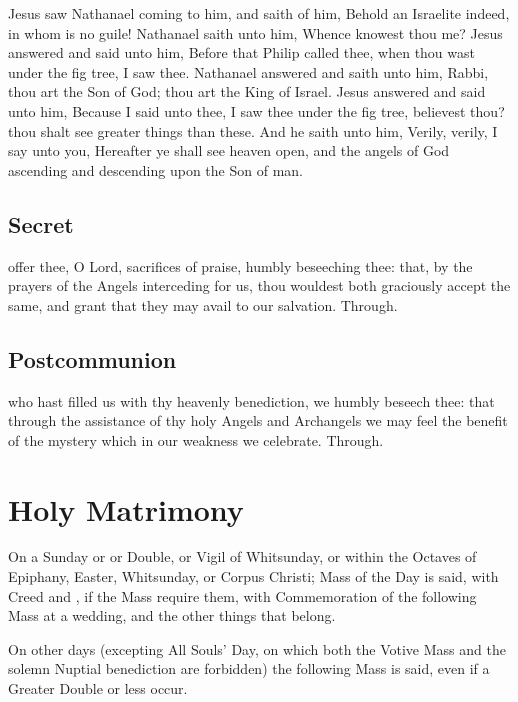  Jesus saw Nathanael coming to him, and saith of him, Behold an Israelite indeed, in whom is no guile! Nathanael saith unto him, Whence knowest thou me? Jesus answered and said unto him, Before that Philip called thee, when thou wast under the fig tree, I saw thee. Nathanael answered and saith unto him, Rabbi, thou art the Son of God; thou art the King of Israel. Jesus answered and said unto him, Because I said unto thee, I saw thee under the fig tree, believest thou? thou shalt see greater things than these. And he saith unto him, Verily, verily, I say unto you, Hereafter ye shall see heaven open, and the angels of God ascending and descending upon the Son of man.


\subsection{Secret}
 offer thee, O Lord, sacrifices of praise, humbly beseeching thee: that, by the prayers of the Angels interceding for us, thou wouldest both graciously accept the same, and grant that they may avail to our salvation. Through.


\subsection{Postcommunion}
 who hast filled us with thy heavenly benediction, we humbly beseech thee: that through the assistance of thy holy Angels and Archangels we may feel the benefit of the mystery which in our weakness we celebrate. Through.

\clearpage

\section{Holy Matrimony}\label{MatrimonyMass}
\fancyhead[RE,LO]{}
\begin{secrubric}
    On a Sunday or  or  Double, or Vigil of Whitsunday, or within the Octaves of Epiphany, Easter, Whitsunday, or Corpus Christi; Mass of the Day is said, with Creed and , if the Mass require them, with Commemoration of the following Mass at a wedding, and the other things that belong.\par
    On other days (excepting All Souls' Day, on which both the Votive Mass and the solemn Nuptial benediction are forbidden) the following Mass is said, even if a Greater Double or less occur.
\end{secrubric}

